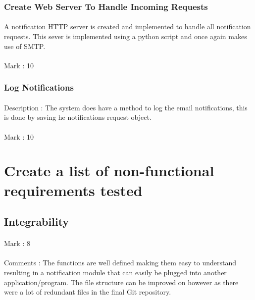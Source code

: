 \documentclass[11pt]{article}
\begin{document}
\subsubsection{Create Web Server To Handle Incoming Requests} 
\paragraph{} A notification HTTP server is created and implemented to handle all notification requests. This sever is implemented using a python script and once again makes use of SMTP.
\paragraph{} Mark : 10

\subsubsection{Log Notifications} 
\paragraph{} Description : The system does have a method to log the email notifications, this is done by saving he notifications request object.
\paragraph{} Mark : 10

\section{Create a list of non-functional requirements tested}
\subsection{Integrability}
\paragraph{} Mark : 8
\paragraph{} Comments : The functions are well defined making them easy to understand resulting in a notification module that can easily be plugged into another application/program. The file structure can be improved on however as there were a lot of redundant files in the final Git repository.
\end{document}
